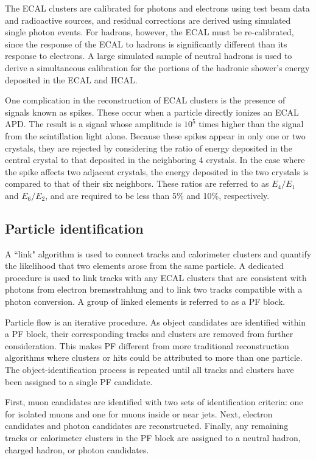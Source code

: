 The ECAL clusters are calibrated for photons and electrons using test beam data and radioactive sources, and residual corrections are derived using simulated single photon events. For hadrons, however, the ECAL must be re-calibrated, since the response of the ECAL to hadrons is significantly different than its response to electrons. A large simulated sample of neutral hadrons is used to derive a simultaneous calibration for the portions of the hadronic shower's energy deposited in the ECAL and HCAL. 

One complication in the reconstruction of ECAL clusters is the presence of signals known as spikes. These occur when a particle directly ionizes an ECAL APD. The result is a signal whose amplitude is $10^5$ times higher than the signal from the scintillation light alone. Because these spikes appear in only one or two crystals, they are rejected by considering the ratio of energy deposited in the central crystal to that deposited in the neighboring 4 crystals. In the case where the spike affects two adjacent crystals, the energy deposited in the two crystals is compared to that of their six neighbors. These ratios are referred to as $E_4/E_1$ and $E_6/E_2$, and are required to be less than 5\% and 10\%, respectively. 

\subsection{Particle identification}
\label{sec:partID}
A ``link" algorithm is used to connect tracks and calorimeter clusters and quantify the likelihood that two elements arose from the same particle. A dedicated procedure is used to link tracks with any ECAL clusters that are consistent with photons from electron bremsstrahlung  and to link two tracks compatible with a photon conversion. A group of linked elements is referred to as a PF block. 

Particle flow is an iterative procedure. As object candidates are identified within a PF block, their corresponding tracks and clusters are removed from further consideration. This makes PF different from more traditional reconstruction algorithms where clusters or hits could be attributed to more than one particle. The object-identification process is repeated until all tracks and clusters have been assigned to a single PF candidate. 

First, muon candidates are identified with two sets of identification criteria: one for isolated muons and one for muons inside or near jets. Next, electron candidates and photon candidates are reconstructed. Finally, any remaining tracks or calorimeter clusters in the PF block are assigned to a neutral hadron, charged hadron, or photon candidates.

